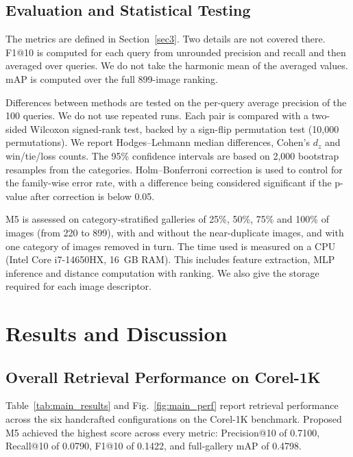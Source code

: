 \documentclass[pdflatex,sn-mathphys-num]{sn-jnl}
\begin{document}
\subsection{Evaluation and Statistical Testing}\label{subsec4.4}
The metrics are defined in Section~\ref{sec3}. Two details are not covered there. F1@10 is computed for each query from unrounded precision and recall and then averaged over queries. We do not take the harmonic mean of the averaged values. mAP is computed over the full 899-image ranking.

Differences between methods are tested on the per-query average precision of the 100 queries. We do not use repeated runs. Each pair is compared with a two-sided Wilcoxon signed-rank test, backed by a sign-flip permutation test (10,000 permutations). We report Hodges--Lehmann median differences, Cohen's $d_z$ and win/tie/loss counts. The 95\% confidence intervals are based on 2,000 bootstrap resamples from the categories. Holm--Bonferroni correction is used to control for the family-wise error rate, with a difference being considered significant if the p-value after correction is below 0.05.

M5 is assessed on category-stratified galleries of 25\%, 50\%, 75\% and 100\% of images (from 220 to 899), with and without the near-duplicate images, and with one category of images removed in turn. The time used is measured on a CPU (Intel Core i7-14650HX, 16~GB RAM). This includes feature extraction, MLP inference and distance computation with ranking. We also give the storage required for each image descriptor.

\section{Results and Discussion}\label{sec5}
\subsection{Overall Retrieval Performance on Corel-1K}\label{subsec5.1}
Table~\ref{tab:main_results} and Fig.~\ref{fig:main_perf} report retrieval performance across the six handcrafted configurations on the Corel-1K benchmark. Proposed M5 achieved the highest score across every metric: Precision@10 of 0.7100, Recall@10 of 0.0790, F1@10 of 0.1422, and full-gallery mAP of 0.4798.
\end{document}
